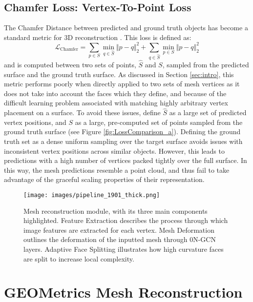 \documentclass{article}
\begin{document}
\subsection{Chamfer Loss: Vertex-To-Point Loss}

The Chamfer Distance between predicted and ground truth objects has become a standard metric for 3D reconstruction \cite{Pixel2Mesh, insafutdinov2018unsupervised, groueix2018atlasnet,pix3d,fan2017point}. This loss is defined as:
\begin{equation}
\mathcal{L}_{\text{Chamfer}}= \sum_{p \in S} \min_{q \in \hat S} \Vert p - q \Vert^2_2 + \sum_{q \in \hat S} \min_{p \in S} \Vert p - q \Vert^2_2
\label{eq:chamfer}
\end{equation}
and is computed between two sets of points, $\hat S$ and $S$, sampled from the predicted surface and the ground truth surface. As discussed in Section \ref{sec:intro}, this metric performs poorly when directly applied to two sets of mesh vertices as it does not take into account the faces which they define, and because of the difficult learning problem associated with matching highly arbitrary vertex placement on a surface. To avoid these issues, \citet{Pixel2Mesh} define $\hat S$ as a large set of predicted vertex positions, and $S$ as a large, pre-computed set of points sampled from the ground truth surface (see Figure \ref{fig:LossComparison_a}). 
Defining the ground truth set as a dense uniform sampling over the target surface avoids issues with inconsistent vertex positions across similar objects. However, this leads to predictions with a high number of vertices packed tightly over the full surface. In this way, the mesh predictions resemble a point cloud, and thus fail to take advantage of the graceful scaling properties of their representation.

\begin{figure*} 
\centering
\texttt{[image: images/pipeline\_1901\_thick.png]}
\vspace{-4mm}
\caption{Mesh reconstruction module, with its three main components highlighted. Feature Extraction describes the process through which image features are extracted for each vertex. Mesh Deformation outlines the deformation of the inputted mesh through 0N-GCN layers. Adaptive Face Splitting illustrates how high curvature faces are split to increase local complexity.} \label{fig:MeshGeneration}
\end{figure*}

\section{GEOMetrics Mesh Reconstruction}
\end{document}
